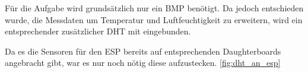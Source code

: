 Für die Aufgabe wird grundsätzlich nur ein BMP benötigt.
Da jedoch entschieden wurde, die Messdaten um Temperatur und Luftfeuchtigkeit zu erweitern, 
wird ein entsprechender zusätzlicher DHT mit eingebunden.

Da es die Sensoren für den ESP bereits auf entsprechenden Daughterboards angebracht gibt,
war es nur noch nötig diese aufzustecken. \ref{fig:dht_an_esp}